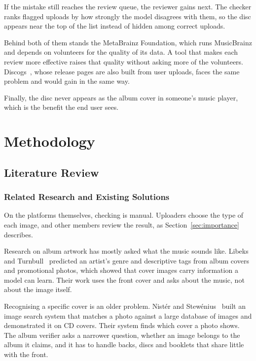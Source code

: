\documentclass[conference]{IEEEtran}
\begin{document}
If the mistake still reaches the review queue, the reviewer gains next. The checker ranks flagged uploads by how strongly the model disagrees with them, so the disc appears near the top of the list instead of hidden among correct uploads.

Behind both of them stands the MetaBrainz Foundation, which runs MusicBrainz and depends on volunteers for the quality of its data. A tool that makes each review more effective raises that quality without asking more of the volunteers. Discogs~\cite{discogs}, whose release pages are also built from user uploads, faces the same problem and would gain in the same way.

Finally, the disc never appears as the album cover in someone's music player, which is the benefit the end user sees.

\section{Methodology}\label{sec:method}

\subsection{Literature Review}\label{sec:lit}

\subsubsection{Related Research and Existing Solutions}\label{sec:related}
On the platforms themselves, checking is manual. Uploaders choose the type of each image, and other members review the result, as Section~\ref{sec:importance} describes.

Research on album artwork has mostly asked what the music sounds like. Libeks and Turnbull~\cite{libeks2011judge} predicted an artist's genre and descriptive tags from album covers and promotional photos, which showed that cover images carry information a model can learn. Their work uses the front cover and asks about the music, not about the image itself.

Recognising a specific cover is an older problem. Nistér and Stewénius~\cite{nister2006scalable} built an image search system that matches a photo against a large database of images and demonstrated it on CD covers. Their system finds which cover a photo shows. The album verifier asks a narrower question, whether an image belongs to the album it claims, and it has to handle backs, discs and booklets that share little with the front.
\end{document}
